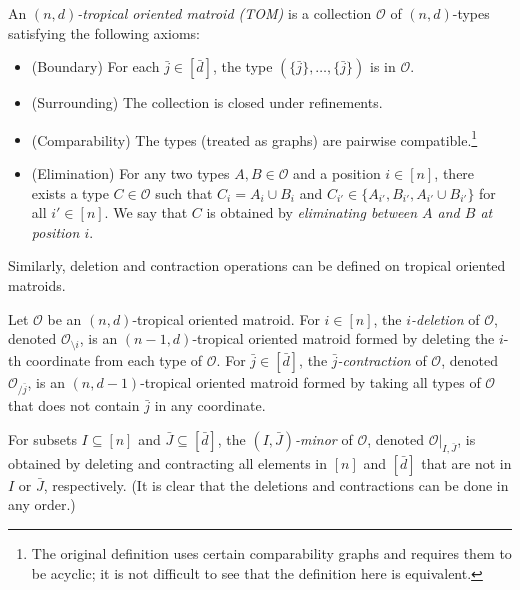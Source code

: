 \documentclass[letterpaper,reqno,11pt]{amsart}
\begin{document}
\begin{definition}
    An \emph{$(n,d)$-tropical oriented matroid (TOM)} is a collection $\mathcal{O}$ of $(n,d)$-types satisfying the following axioms: \begin{itemize}
        \item (Boundary) For each $\bar{j}\in [\bar{d}]$, the type $(\{\bar{j}\}, \dots, \{\bar{j}\})$ is in $\mathcal{O}$.
        \item (Surrounding) The collection is closed under refinements.
        \item (Comparability) The types (treated as graphs) are pairwise compatible.\footnote{The original definition uses certain comparability graphs and requires them to be acyclic; it is not difficult to see that the definition here is equivalent.}
        \item (Elimination) For any two types $A, B \in \mathcal{O}$ and a position $i\in [n]$, there exists a type $C\in \mathcal{O}$ such that $C_i = A_i\cup B_i$ and $C_{i'} \in \{A_{i'}, B_{i'}, A_{i'}\cup B_{i'}\}$ for all $i'\in [n]$. We say that $C$ is obtained by \emph{eliminating between $A$ and $B$ at position $i$}.
    \end{itemize}
\end{definition}

Similarly, deletion and contraction operations can be defined on tropical oriented matroids.

\begin{definition}\label{def:minors}
    Let $\mathcal{O}$ be an $(n,d)$-tropical oriented matroid.    
    For $i\in [n]$, the \emph{$i$-deletion} of $\mathcal{O}$, denoted $\mathcal{O}_{\setminus i}$, is an $(n-1, d)$-tropical oriented matroid formed by deleting the $i$-th coordinate from each type of $\mathcal{O}$.
    For $\bar{j}\in [\bar{d}]$, the \emph{$\bar{j}$-contraction} of $\mathcal{O}$, denoted $\mathcal{O}_{/\bar{j}}$, is an $(n,d-1)$-tropical oriented matroid formed by taking all types of $\mathcal{O}$ that does not contain $\bar{j}$ in any coordinate.

    For subsets $I\subseteq [n]$ and $\bar{J}\subseteq [\bar{d}]$, the \emph{$(I, \bar{J})$-minor} of $\mathcal{O}$, denoted $\mathcal{O}|_{I, \bar{J}}$, is obtained by deleting and contracting all elements in $[n]$ and $[\bar{d}]$ that are not in $I$ or $\bar{J}$, respectively. (It is clear that the deletions and contractions can be done in any order.)
\end{definition}
\end{document}
